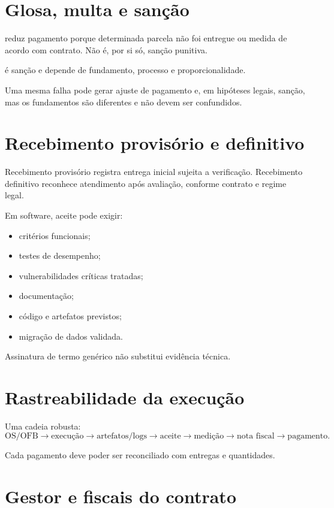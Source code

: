 \section{Glosa, multa e sanção}

 reduz pagamento porque determinada parcela não foi entregue ou medida de acordo com contrato. Não é, por si só, sanção punitiva.

 é sanção e depende de fundamento, processo e proporcionalidade.

Uma mesma falha pode gerar ajuste de pagamento e, em hipóteses legais, sanção, mas os fundamentos são diferentes e não devem ser confundidos.

\section{Recebimento provisório e definitivo}

Recebimento provisório registra entrega inicial sujeita a verificação. Recebimento definitivo reconhece atendimento após avaliação, conforme contrato e regime legal.

Em software, aceite pode exigir:
\begin{itemize}
\item critérios funcionais;
\item testes de desempenho;
\item vulnerabilidades críticas tratadas;
\item documentação;
\item código e artefatos previstos;
\item migração de dados validada.
\end{itemize}

Assinatura de termo genérico não substitui evidência técnica.

\section{Rastreabilidade da execução}

Uma cadeia robusta:
\[
\text{OS/OFB}
\rightarrow
\text{execução}
\rightarrow
\text{artefatos/logs}
\rightarrow
\text{aceite}
\rightarrow
\text{medição}
\rightarrow
\text{nota fiscal}
\rightarrow
\text{pagamento}.
\]

Cada pagamento deve poder ser reconciliado com entregas e quantidades.

\section{Gestor e fiscais do contrato}

